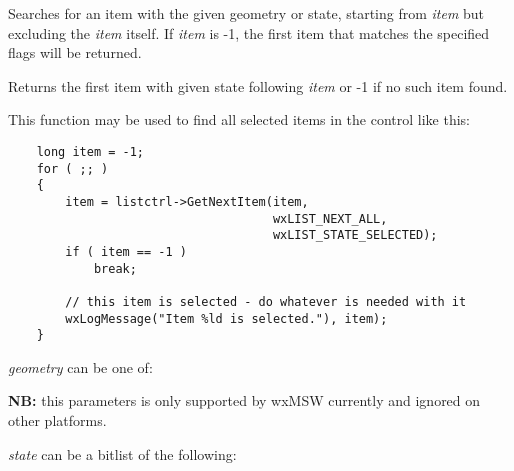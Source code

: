 \label{wxlistctrlgetnextitem}


Searches for an item with the given geometry or state, starting from
{\it item} but excluding the {\it item} itself. If {\it item} is -1,
the first item that matches the specified flags will be returned.

Returns the first item with given state following {\it item} or -1 if
no such item found.

This function may be used to find all selected items in the control like this:

\begin{verbatim}
    long item = -1;
    for ( ;; )
    {
        item = listctrl->GetNextItem(item,
                                     wxLIST_NEXT_ALL,
                                     wxLIST_STATE_SELECTED);
        if ( item == -1 )
            break;

        // this item is selected - do whatever is needed with it
        wxLogMessage("Item %ld is selected."), item);
    }
\end{verbatim}

{\it geometry} can be one of:

\twocolwidtha{5cm}
\begin{twocollist}\itemsep=0pt
\end{twocollist}

{\bf NB:} this parameters is only supported by wxMSW currently and ignored on
other platforms.

{\it state} can be a bitlist of the following:

\twocolwidtha{5cm}
\begin{twocollist}\itemsep=0pt
\end{twocollist}


